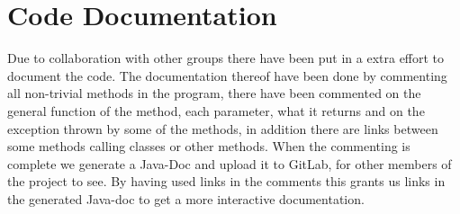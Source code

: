 \section{Code Documentation} \label{sec:code_documentation}
Due to collaboration with other groups there have been put in a extra effort to document the code. The documentation thereof have been done by commenting all non-trivial methods in the program, there have been commented on the general function of the method, each parameter, what it returns and on the exception thrown by some of the methods, in addition there are links between some methods calling classes or other methods. When the commenting is complete we generate a Java-Doc and upload it to GitLab, for other members of the project to see. By having used links in the comments this grants us links in the generated Java-doc to get a more interactive documentation. 
